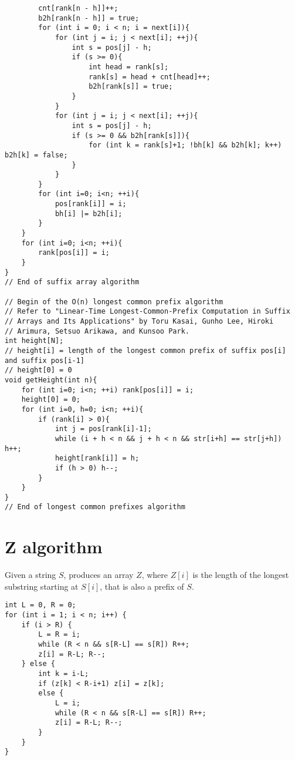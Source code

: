 \documentclass[a4paper,final,8pt]{article}
\begin{document}
\begin{lstlisting}
        cnt[rank[n - h]]++;
        b2h[rank[n - h]] = true;
        for (int i = 0; i < n; i = next[i]){
            for (int j = i; j < next[i]; ++j){
                int s = pos[j] - h;
                if (s >= 0){
                    int head = rank[s];
                    rank[s] = head + cnt[head]++;
                    b2h[rank[s]] = true;
                }
            }
            for (int j = i; j < next[i]; ++j){
                int s = pos[j] - h;
                if (s >= 0 && b2h[rank[s]]){
                    for (int k = rank[s]+1; !bh[k] && b2h[k]; k++) b2h[k] = false;
                }
            }
        }
        for (int i=0; i<n; ++i){
            pos[rank[i]] = i;
            bh[i] |= b2h[i];
        }
    }
    for (int i=0; i<n; ++i){
        rank[pos[i]] = i;
    }
}
// End of suffix array algorithm

// Begin of the O(n) longest common prefix algorithm
// Refer to "Linear-Time Longest-Common-Prefix Computation in Suffix
// Arrays and Its Applications" by Toru Kasai, Gunho Lee, Hiroki
// Arimura, Setsuo Arikawa, and Kunsoo Park.
int height[N];
// height[i] = length of the longest common prefix of suffix pos[i] and suffix pos[i-1]
// height[0] = 0
void getHeight(int n){
    for (int i=0; i<n; ++i) rank[pos[i]] = i;
    height[0] = 0;
    for (int i=0, h=0; i<n; ++i){
        if (rank[i] > 0){
            int j = pos[rank[i]-1];
            while (i + h < n && j + h < n && str[i+h] == str[j+h]) h++;
            height[rank[i]] = h;
            if (h > 0) h--;
        }
    }
}
// End of longest common prefixes algorithm
\end{lstlisting}


\section{Z algorithm}

Given a string $S$, produces an array $Z$, where $Z[i]$ is the length of the
longest substring starting at $S[i]$, that is also a prefix of $S$.

\begin{lstlisting}
int L = 0, R = 0;
for (int i = 1; i < n; i++) {
    if (i > R) {
        L = R = i;
        while (R < n && s[R-L] == s[R]) R++;
        z[i] = R-L; R--;
    } else {
        int k = i-L;
        if (z[k] < R-i+1) z[i] = z[k];
        else {
            L = i;
            while (R < n && s[R-L] == s[R]) R++;
            z[i] = R-L; R--;
        }
    }
}
\end{lstlisting}
\end{document}
